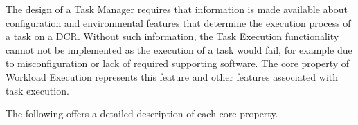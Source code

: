 \documentclass{sig-alternate}
\begin{document}
The design of a Task Manager requires that information is made available about
configuration and environmental features that determine the execution process of
a task on a DCR. Without such information, the Task Execution functionality
cannot not be implemented as the execution of a task would fail, for example due
to misconfiguration or lack of required supporting software.  The core property
of Workload Execution represents this feature and other features associated with
task execution.

The following offers a detailed description of each core property.




\end{document}
